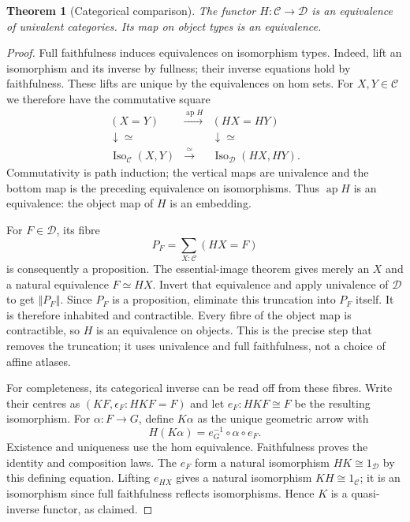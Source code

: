 \documentclass[11pt]{amsart}
\newtheorem{theorem}{Theorem}[section]
\theoremstyle{definition}\newtheorem{definition}[theorem]{Definition}
\theoremstyle{remark}\newtheorem{remark}[theorem]{Remark}
\newcommand{\tr}[1]{\left\Vert #1\right\Vert}
\begin{document}
\begin{theorem}[Categorical comparison]
The functor $H:\mathcal C\to\mathcal D$ is an equivalence of univalent
categories. Its map on object types is an equivalence.
\end{theorem}
\begin{proof}
Full faithfulness induces equivalences on isomorphism types. Indeed,
lift an isomorphism and its inverse by fullness; their inverse equations
hold by faithfulness. These lifts are unique by the equivalences on hom
sets. For $X,Y\in\mathcal C$ we therefore have the commutative square
\[
\begin{array}{ccc}
 (X=Y)&\xrightarrow{\operatorname{ap}H}&(HX=HY)\\
 \downarrow\scriptstyle{\simeq}&&\downarrow\scriptstyle{\simeq}\\
 \operatorname{Iso}_{\mathcal C}(X,Y)&\xrightarrow{\simeq}&
 \operatorname{Iso}_{\mathcal D}(HX,HY).
\end{array}
\]
Commutativity is path induction; the vertical maps are univalence and
the bottom map is the preceding equivalence on isomorphisms. Thus
$\operatorname{ap}H$ is an equivalence: the object map of $H$ is an
embedding.

For $F\in\mathcal D$, its fibre
\[
 P_F=\sum_{X:\mathcal C}(HX=F)
\]
is consequently a proposition. The essential-image theorem gives merely
an $X$ and a natural equivalence $F\simeq HX$. Invert that equivalence
and apply univalence of $\mathcal D$ to get $\tr{P_F}$. Since $P_F$ is a
proposition, eliminate this truncation into $P_F$ itself. It is therefore
inhabited and contractible. Every fibre of the object map is contractible,
so $H$ is an equivalence on objects. This is the precise step that removes
the truncation; it uses univalence and full faithfulness, not a choice
of affine atlases.

For completeness, its categorical inverse can be read off from these
fibres. Write their centres as $(KF,\epsilon_F:HKF=F)$ and let
$e_F:HKF\cong F$ be the resulting isomorphism. For
$\alpha:F\to G$, define $K\alpha$ as the unique geometric arrow with
\[
 H(K\alpha)=e_G^{-1}\circ\alpha\circ e_F.
\]
Existence and uniqueness use the hom equivalence. Faithfulness proves
the identity and composition laws. The $e_F$ form a natural isomorphism
$HK\cong1_{\mathcal D}$ by this defining equation. Lifting $e_{HX}$
gives a natural isomorphism $KH\cong1_{\mathcal C}$; it is an
isomorphism since full faithfulness reflects isomorphisms. Hence $K$ is
a quasi-inverse functor, as claimed.
\end{proof}
\end{document}
